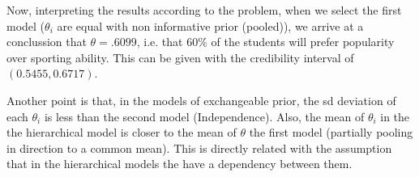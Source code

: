 \documentclass{article}
\begin{document}
Now, interpreting the results according to the problem, when we select the first model ($\theta_i$ are equal with non informative prior (pooled)), we arrive at a conclussion that $\theta = .6099$, i.e. that 60\% of the students will prefer popularity over sporting ability. This can be given with the credibility interval of $(0.5455, 0.6717)$.

Another point is that, in the models of exchangeable prior, the sd deviation of each $\theta_i$ is less than the second model (Independence). Also, the mean of $\theta_i$ in the the hierarchical model is closer to the mean of $\theta$ the first model (partially pooling in direction to a common mean). 
This is directly related with the assumption that in the hierarchical models the have a dependency between them. 
\end{document}
